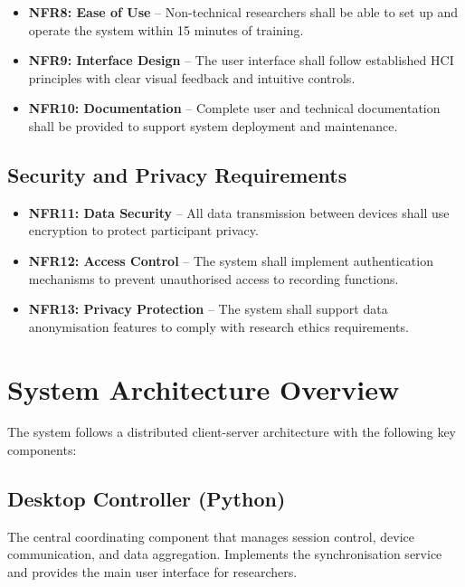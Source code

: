 \begin{itemize}
\item \textbf{NFR8: Ease of Use} -- Non-technical researchers shall be able to set up and operate the system within 15 minutes of training.

\item \textbf{NFR9: Interface Design} -- The user interface shall follow established HCI principles with clear visual feedback and intuitive controls.

\item \textbf{NFR10: Documentation} -- Complete user and technical documentation shall be provided to support system deployment and maintenance.
\end{itemize}

\subsection{Security and Privacy Requirements}

\begin{itemize}
\item \textbf{NFR11: Data Security} -- All data transmission between devices shall use encryption to protect participant privacy.

\item \textbf{NFR12: Access Control} -- The system shall implement authentication mechanisms to prevent unauthorised access to recording functions.

\item \textbf{NFR13: Privacy Protection} -- The system shall support data anonymisation features to comply with research ethics requirements.
\end{itemize}

\section{System Architecture Overview}

The system follows a distributed client-server architecture with the following key components:

\subsection{Desktop Controller (Python)}
The central coordinating component that manages session control, device communication, and data aggregation. Implements the synchronisation service and provides the main user interface for researchers.

